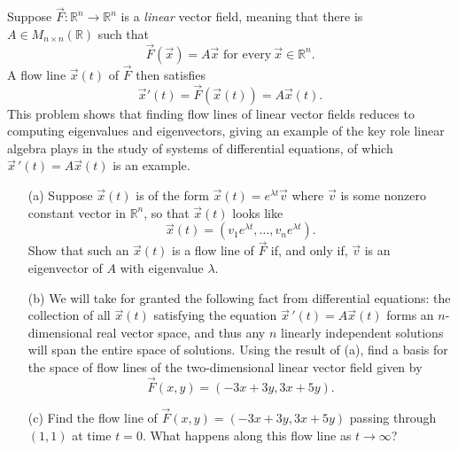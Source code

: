 \documentclass[11pt,letterpaper,cm]{nupset}
\begin{document}
\begin{problem}[Exercise 7] Suppose $\vec{F}: \mathbb{R}^n \to \mathbb{R}^n$ is a \textit{linear} vector field, meaning that there is $A\in M_{n\times n}(\mathbb{R})$ such that
	$$\vec{F}(\vec{x}) = A\vec{x} \text{ for every}\ \vec{x} \in \mathbb{R}^n.$$
	A flow line $\vec{x}(t)$ of $\vec{F}$ then satisfies
	$$\vec{x}'(t) = \vec{F}(\vec{x}(t)) = A\vec{x}(t).$$
	This problem shows that finding flow lines of linear vector fields reduces to computing eigenvalues and eigenvectors, giving an example of the key role linear algebra plays in the study of systems of differential equations, of which $\vec{x}\,'(t) = A\vec{x}(t)$ is an example.
	\begin{itemize}
		\item[(a)] Suppose $\vec{x}(t)$ is of the form $\vec{x}(t) = e^{\lambda t}\vec{v}$ where $\vec{v}$ is some nonzero constant vector in $\mathbb{R}^n$, so that $\vec{x}(t)$ looks like
		$$\vec{x}(t) = (v_1e^{\lambda t},\ldots,v_ne^{\lambda t}).$$
		Show that such an $\vec{x}(t)$ is a flow line of $\vec{F}$ if, and only if, $\vec{v}$ is an eigenvector of $A$ with eigenvalue $\lambda$.
		\item[(b)] We will take for granted the following fact from differential equations: the collection of all $\vec{x}(t)$ satisfying the equation $\vec{x}\,'(t) = A\vec{x}(t)$ forms an $n$-dimensional real vector space, and thus any $n$ linearly independent solutions will span the entire space of solutions. Using the result of (a), find a basis for the space of flow lines of the two-dimensional linear vector field given by
		$$\vec{F}(x,y) = (-3x+3y, 3x+5y).$$
		\item[(c)] Find the flow line of $\vec{F}(x,y) = (-3x+3y,3x+5y)$ passing through $(1,1)$ at time $t=0$. What happens along this flow line as $t \to \infty$?
	\end{itemize}
\end{problem}
\end{document}
